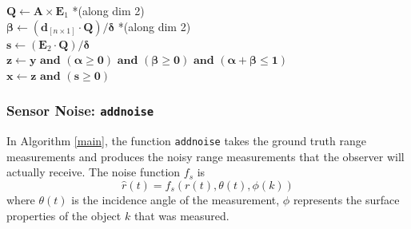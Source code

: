 \begin{singlespace}
\begin{algorithm}
{		$\mathbf{Q} \longleftarrow \mathbf{A} \times \mathbf{E}_1$ *(along dim 2)\\
		$\bm{\beta} \longleftarrow (\mathbf{d}_{[n \times 1]} \cdot \mathbf{Q})/\bm{\delta}$ *(along dim 2)\\
		$\mathbf{s} \longleftarrow (\mathbf{E}_2 \cdot \mathbf{Q})/\bm{\delta}$\\
		$\mathbf{z} \longleftarrow \mathbf{y} \textbf{ and } (\bm{\alpha} \geq \mathbf{0}) 
		\textbf{ and } (\bm{\beta} \geq \mathbf{0}) \textbf{ and } (\bm{\alpha}+\bm{\beta} \leq 
		\mathbf{1})$\\
		$\mathbf{x} \longleftarrow \mathbf{z} \textbf{ and } (\mathbf{s} \geq \mathbf{0})$ \label{line: intersectvec} \\
	}
	\caption{M{\"o}ller-Trumbore ray-triangle intersection} \label{intersectionalgorithm}
	\end{algorithm}
	\end{singlespace}
		
	\subsubsection{Sensor Noise: \texttt{addnoise}}
	In Algorithm \ref{main}, the function \texttt{addnoise} takes the ground truth range measurements and produces the noisy range measurements that the observer will actually receive.
	The noise function $f_s$ is
	\begin{equation}
		\hat{r}(t) = f_s(r(t),\theta(t),\phi(k))
	\end{equation}
	where $\theta(t)$ is the incidence angle of the measurement, $\phi$ represents the surface properties of the object $k$ that was measured.
	
